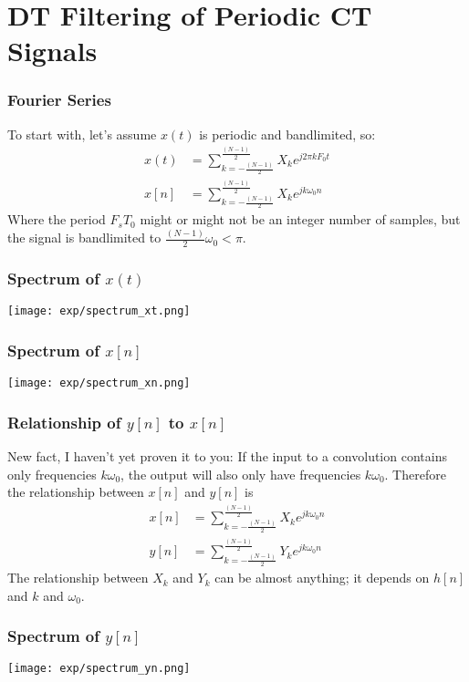 \documentclass{beamer}
\begin{document}
\section{DT Filtering of Periodic CT Signals}
\setcounter{subsection}{1}

\begin{frame}
  \frametitle{Fourier Series}

  To start with, let's assume $x(t)$ is periodic and bandlimited, so:
  \begin{align*}
    x(t)&=\sum_{k=-\frac{(N-1)}{2}}^{\frac{(N-1)}{2}}X_ke^{j2\pi kF_0t}\\
    x[n]&=\sum_{k=-\frac{(N-1)}{2}}^{\frac{(N-1)}{2}}X_ke^{jk\omega_0n}
  \end{align*}
  Where the period $F_sT_0$ might or might not be an integer number of
  samples, but the signal is bandlimited to
  $\frac{(N-1)}{2}\omega_0<\pi$.
\end{frame}

\begin{frame}
  \frametitle{Spectrum of $x(t)$}

  \centerline{\texttt{[image: exp/spectrum\_xt.png]}}
\end{frame}

\begin{frame}
  \frametitle{Spectrum of $x[n]$}

  \centerline{\texttt{[image: exp/spectrum\_xn.png]}}
\end{frame}

\begin{frame}
  \frametitle{Relationship of $y[n]$ to $x[n]$}

  New fact, I haven't yet proven it to you: If the input to a
  convolution contains only frequencies $k\omega_0$, the output will
  also only have frequencies $k\omega_0$.  Therefore the relationship
  between $x[n]$ and $y[n]$ is
  \begin{align*}
    x[n]&=\sum_{k=-\frac{(N-1)}{2}}^{\frac{(N-1)}{2}}X_ke^{jk\omega_0n}\\
    y[n]&=\sum_{k=-\frac{(N-1)}{2}}^{\frac{(N-1)}{2}}Y_ke^{jk\omega_0n}
  \end{align*}
  The relationship between $X_k$ and $Y_k$ can be almost anything; it
  depends on $h[n]$ and $k$ and $\omega_0$.
\end{frame}

\begin{frame}
  \frametitle{Spectrum of $y[n]$}

  \centerline{\texttt{[image: exp/spectrum\_yn.png]}}
\end{frame}
\end{document}
